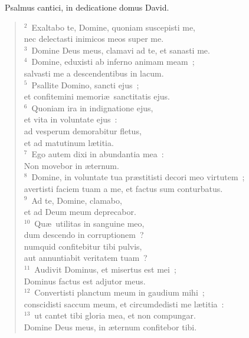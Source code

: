 ~\lettrine[lines=10,image=true,loversize=0.05,lraise=-0.03]{P}{}salmus cantici, in dedicatione domus David.
\begin{flushleft}\begin{verse}\vspace{6pt}${}^{2}$~Exaltabo te, Domine, quoniam suscepisti me,\\ nec delectasti inimicos meos super me.\\
${}^{3}$~Domine Deus meus, clamavi ad te, et sanasti me.\\
${}^{4}$~Domine, eduxisti ab inferno animam meam~;\\ salvasti me a descendentibus in lacum.\\
${}^{5}$~Psallite Domino, sancti ejus~;\\ et confitemini memori\ae\ sanctitatis ejus.\\
${}^{6}$~Quoniam ira in indignatione ejus,\\ et vita in voluntate ejus~:\\ ad vesperum demorabitur fletus,\\ et ad matutinum l\ae titia.\\
${}^{7}$~Ego autem dixi in abundantia mea~:\\ Non movebor in \ae ternum.\\
${}^{8}$~Domine, in voluntate tua pr\ae stitisti decori meo virtutem~;\\ avertisti faciem tuam a me, et factus sum conturbatus.\\
${}^{9}$~Ad te, Domine, clamabo,\\ et ad Deum meum deprecabor.\\
${}^{10}$~Qu\ae\ utilitas in sanguine meo,\\ dum descendo in corruptionem~?\\ numquid confitebitur tibi pulvis,\\ aut annuntiabit veritatem tuam~?\\
${}^{11}$~Audivit Dominus, et misertus est mei~;\\ Dominus factus est adjutor meus.\\
${}^{12}$~Convertisti planctum meum in gaudium mihi~;\\ conscidisti saccum meum, et circumdedisti me l\ae titia~:\\
${}^{13}$~ut cantet tibi gloria mea, et non compungar.\\ Domine Deus meus, in \ae ternum confitebor tibi.\end{verse}\end{flushleft}


